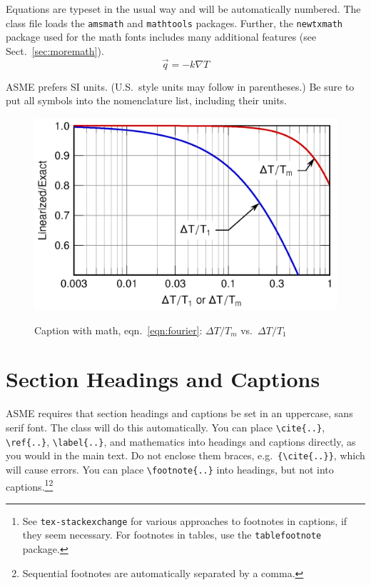 \documentclass[captionpatch,colorlinks,upint,subscriptcorrection,varvw,mathalfa=cal=boondoxo,german]{asmeconf}
\begin{document}
Equations are typeset in the usual way and will be automatically numbered.  The class file loads the \texttt{amsmath} and \texttt{mathtools} packages. Further, the \texttt{newtxmath} package used for the math fonts includes many additional features (see Sect.~\ref{sec:moremath}).
\begin{equation}\label{eqn:fourier}
\vec{q} = -k\nabla T
\end{equation}

ASME prefers SI units. (U.S.\ style units may follow in parentheses.) Be sure to put all symbols into the nomenclature list, including their units.




\begin{figure}
\centering\includegraphics[width=\linewidth, alt = {Linearization error in radiant flux}]{sample-figure-1.png}
\caption{Caption with math, eqn.~\eqref{eqn:fourier}: $\Delta T/T_m$ vs.\ $\Delta T/T_1$~\cite{Lienhard2019}}\label{fig:1}
\end{figure}
 




\section{Section Headings and Captions}

ASME requires that section headings and captions be set in an uppercase, sans serif font.  The class will do this automatically.  You can place \verb|\cite{..}|, \verb|\ref{..}|, \verb|\label{..}|, and mathematics into headings and captions directly, as you would in the main text. Do not enclose them braces, e.g.\ \verb|{\cite{..}}|, which will cause errors. You can place \verb|\footnote{..}| into headings, but not into captions.\footnote{See \texttt{tex-stackexchange} for various approaches to footnotes in captions, if they seem necessary. For footnotes in tables, use the \texttt{tablefootnote} package.}\footnote{Sequential footnotes are automatically separated by a comma.}
\end{document}

